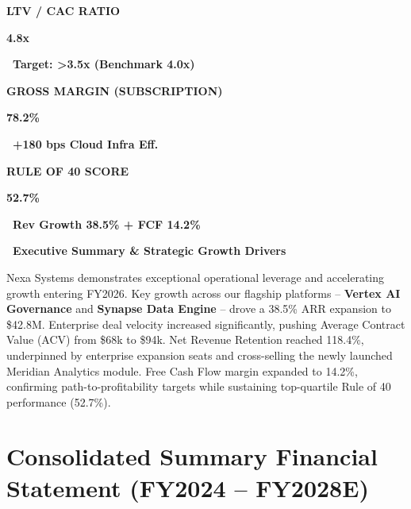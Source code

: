 \documentclass[10pt,a4paper]{article}
\newcommand{\kpival}[3]{%
  {\raggedright
  {\tiny\bfseries\color{MutedText}\uppercase{#1}}\par\vspace{2pt}
  {\Large\bfseries\color{NavyPrimary}#2}\par\vspace{2pt}
  {\small\bfseries#3}\par}%
}
\newcommand{\positivechange}[1]{\color{TealSuccess}\faArrowUp\ #1}
\begin{document}
\noindent
\begin{minipage}[t]{0.31\textwidth}
  \begin{tcolorbox}[kpicard]
    \kpival{LTV / CAC Ratio}{4.8x}{\positivechange{Target: >3.5x (Benchmark 4.0x)}}
  \end{tcolorbox}
\end{minipage}%
\hfill
\begin{minipage}[t]{0.31\textwidth}
  \begin{tcolorbox}[kpicard]
    \kpival{Gross Margin (Subscription)}{78.2\%}{\positivechange{+180 bps Cloud Infra Eff.}}
  \end{tcolorbox}
\end{minipage}%
\hfill
\begin{minipage}[t]{0.31\textwidth}
  \begin{tcolorbox}[kpicard]
    \kpival{Rule of 40 Score}{52.7\%}{\positivechange{Rev Growth 38.5\% + FCF 14.2\%}}
  \end{tcolorbox}
\end{minipage}

\vspace{10pt}

\begin{tcolorbox}[calloutbox]
  \noindent\textbf{\color{NavyPrimary}\faFile\ Executive Summary \& Strategic Growth Drivers}
  \par\vspace{4pt}
  \small\color{DarkText}
  Nexa Systems demonstrates exceptional operational leverage and accelerating growth entering FY2026. Key growth across our flagship platforms -- \textbf{Vertex AI Governance} and \textbf{Synapse Data Engine} -- drove a 38.5\% ARR expansion to \$42.8M. Enterprise deal velocity increased significantly, pushing Average Contract Value (ACV) from \$68k to \$94k. Net Revenue Retention reached 118.4\%, underpinned by enterprise expansion seats and cross-selling the newly launched Meridian Analytics module. Free Cash Flow margin expanded to 14.2\%, confirming path-to-profitability targets while sustaining top-quartile Rule of 40 performance (52.7\%).
\end{tcolorbox}

\vspace{8pt}

\section{Consolidated Summary Financial Statement (FY2024 -- FY2028E)}
\end{document}
